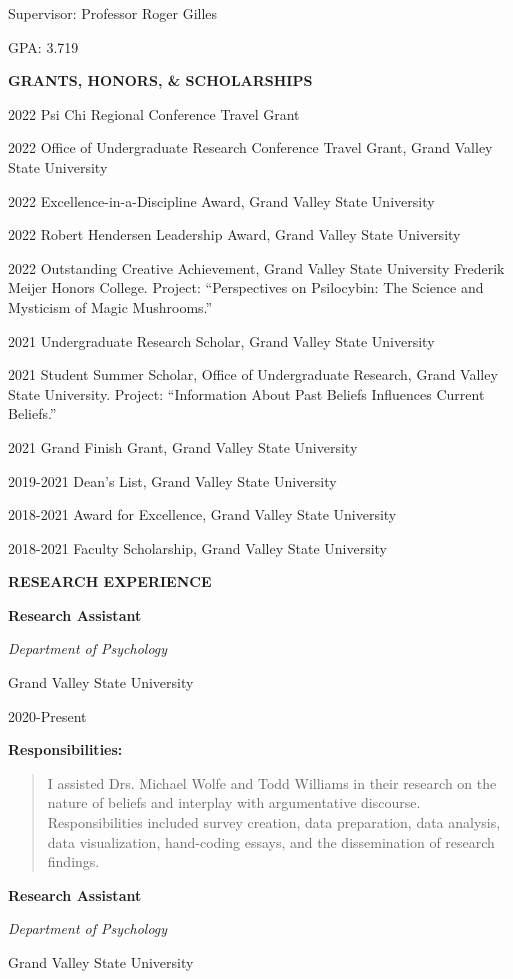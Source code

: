 \documentclass[10pt,a4paper,]{article}
\begin{document}
Supervisor: Professor Roger Gilles

GPA: 3.719

\textbf{GRANTS, HONORS, \& SCHOLARSHIPS}

2022 Psi Chi Regional Conference Travel Grant

2022 Office of Undergraduate Research Conference Travel Grant, Grand
Valley State University

2022 Excellence-in-a-Discipline Award, Grand Valley State University

2022 Robert Hendersen Leadership Award, Grand Valley State University

2022 Outstanding Creative Achievement, Grand Valley State University
Frederik Meijer Honors College. Project: ``Perspectives on Psilocybin:
The Science and Mysticism of Magic Mushrooms.''

2021 Undergraduate Research Scholar, Grand Valley State University

2021 Student Summer Scholar, Office of Undergraduate Research, Grand
Valley State University. Project: ``Information About Past Beliefs
Influences Current Beliefs.''

2021 Grand Finish Grant, Grand Valley State University

2019-2021 Dean's List, Grand Valley State University

2018-2021 Award for Excellence, Grand Valley State University

2018-2021 Faculty Scholarship, Grand Valley State University

\textbf{RESEARCH EXPERIENCE}

\textbf{Research Assistant}

\emph{Department of Psychology}

Grand Valley State University

2020-Present

\textbf{Responsibilities:}

\begin{quote}
I assisted Drs. Michael Wolfe and Todd Williams in their research on the
nature of beliefs and interplay with argumentative discourse.
Responsibilities included survey creation, data preparation, data
analysis, data visualization, hand-coding essays, and the dissemination
of research findings.
\end{quote}

\textbf{Research Assistant}

\emph{Department of Psychology}

Grand Valley State University
\end{document}
